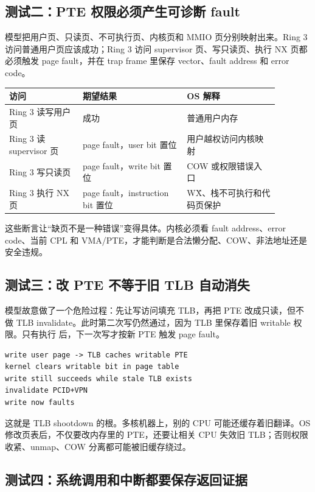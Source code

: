 \subsection{测试二：PTE 权限必须产生可诊断 fault}

模型把用户页、只读页、不可执行页、内核页和 MMIO 页分别映射出来。Ring 3 访问普通用户页应该成功；Ring 3 访问 supervisor 页、写只读页、执行 NX 页都必须触发 page fault，并在 trap frame 里保存 vector、fault address 和 error code。

\begin{longtable}{p{0.24\linewidth}p{0.34\linewidth}p{0.30\linewidth}}
\toprule
访问 & 期望结果 & OS 解释 \\
\midrule
Ring 3 读写用户页 & 成功 & 普通用户内存 \\
Ring 3 读 supervisor 页 & page fault，user bit 置位 & 用户越权访问内核映射 \\
Ring 3 写只读页 & page fault，write bit 置位 & COW 或权限错误入口 \\
Ring 3 执行 NX 页 & page fault，instruction bit 置位 & W\^X、栈不可执行和代码页保护 \\
\bottomrule
\end{longtable}

这些断言让“缺页不是一种错误”变得具体。内核必须看 fault address、error code、当前 CPL 和 VMA/PTE，才能判断是合法懒分配、COW、非法地址还是安全违规。

\subsection{测试三：改 PTE 不等于旧 TLB 自动消失}

模型故意做了一个危险过程：先让写访问填充 TLB，再把 PTE 改成只读，但不做 TLB invalidate。此时第二次写仍然通过，因为 TLB 里保存着旧 writable 权限。只有执行  后，下一次写才按新 PTE 触发 page fault。

\begin{lstlisting}
write user page -> TLB caches writable PTE
kernel clears writable bit in page table
write still succeeds while stale TLB exists
invalidate PCID+VPN
write now faults
\end{lstlisting}

这就是 TLB shootdown 的根。多核机器上，别的 CPU 可能还缓存着旧翻译。OS 修改页表后，不仅要改内存里的 PTE，还要让相关 CPU 失效旧 TLB；否则权限收紧、unmap、COW 分离都可能被旧缓存绕过。

\subsection{测试四：系统调用和中断都要保存返回证据}

